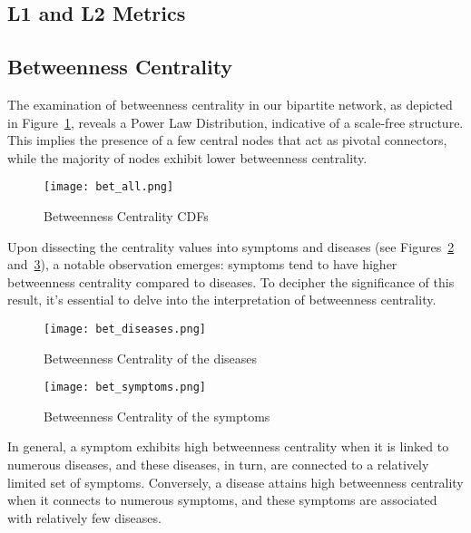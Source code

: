 
\subsection{L1 and L2 Metrics}


\subsection{Betweenness Centrality}
The examination of betweenness centrality in our bipartite network, as depicted in Figure~\ref{fig:bet_all}, 
reveals a Power Law Distribution, indicative of a scale-free structure. This implies the presence of a few central 
nodes that act as pivotal connectors, while the majority of nodes exhibit lower betweenness centrality.

\begin{figure}[H]
    \centering
    \texttt{[image: bet\_all.png]}
    \caption{Betweenness Centrality CDFs}
    \label{fig:bet_all}
 \end{figure}

Upon dissecting the centrality values into symptoms and diseases (see Figures~\ref{fig:bet_diseases} and~\ref{fig:bet_symptoms}), 
a notable observation emerges: symptoms tend to have higher betweenness centrality compared to diseases. To decipher the 
significance of this result, it's essential to delve into the interpretation of betweenness centrality.

\begin{figure}[H]
    \centering
    \texttt{[image: bet\_diseases.png]}
    \caption{Betweenness Centrality of the diseases}
    \label{fig:bet_diseases}
\end{figure}

\begin{figure}[H]
    \centering
    \texttt{[image: bet\_symptoms.png]}
    \caption{Betweenness Centrality of the symptoms}
    \label{fig:bet_symptoms}
\end{figure}

In general, a symptom exhibits high betweenness centrality when it is linked to numerous diseases, and these diseases, 
in turn, are connected to a relatively limited set of symptoms. Conversely, a disease attains high betweenness centrality 
when it connects to numerous symptoms, and these symptoms are associated with relatively few diseases.

